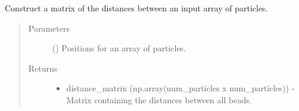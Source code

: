 \documentclass[letterpaper,12pt,english,openany,oneside]{sphinxmanual}
\begin{document}
\begin{fulllineitems}
\label{\detokenize{utilities:utilities.util.distance_matrix}}
Construct a matrix of the distances between an input array of particles.
\begin{quote}\begin{description}
\item[{Parameters}] \leavevmode
{} (\sphinxstyleliteralemphasis{\sphinxupquote{( }}\sphinxstyleliteralemphasis{\sphinxupquote{ ( }}\sphinxstyleliteralemphasis{\sphinxupquote{ ) }}\sphinxstyleliteralemphasis{\sphinxupquote{)}}) \textendash{} Positions for an array of particles.

\item[{Returns}] \leavevmode
\begin{itemize}
\item {} 
distance\_matrix (np.array(num\_particles x num\_particles)) - Matrix containing the distances between all beads.

\end{itemize}


\end{description}\end{quote}

\end{fulllineitems}

\end{document}
